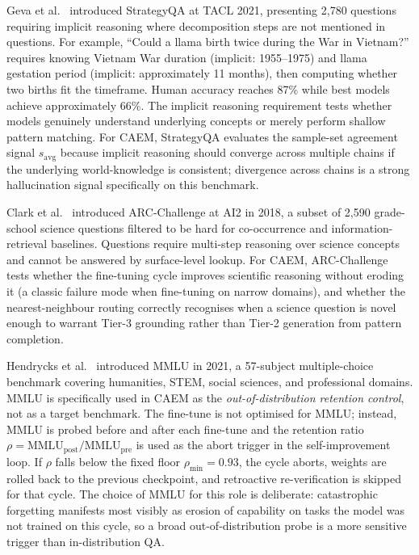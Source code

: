 Geva et al.~\cite{10.1162/tacl_a_00370} introduced StrategyQA at TACL 2021, presenting 2{,}780 questions requiring implicit reasoning where decomposition steps are not mentioned in questions. For example, ``Could a llama birth twice during the War in Vietnam?'' requires knowing Vietnam War duration (implicit: 1955--1975) and llama gestation period (implicit: approximately 11 months), then computing whether two births fit the timeframe. Human accuracy reaches 87\% while best models achieve approximately 66\%. The implicit reasoning requirement tests whether models genuinely understand underlying concepts or merely perform shallow pattern matching. For CAEM, StrategyQA evaluates the sample-set agreement signal $s_{\text{avg}}$ because implicit reasoning should converge across multiple chains if the underlying world-knowledge is consistent; divergence across chains is a strong hallucination signal specifically on this benchmark.

Clark et al.~\cite{clark2018think} introduced ARC-Challenge at AI2 in 2018, a subset of 2{,}590 grade-school science questions filtered to be hard for co-occurrence and information-retrieval baselines. Questions require multi-step reasoning over science concepts and cannot be answered by surface-level lookup. For CAEM, ARC-Challenge tests whether the fine-tuning cycle improves scientific reasoning without eroding it (a classic failure mode when fine-tuning on narrow domains), and whether the nearest-neighbour routing correctly recognises when a science question is novel enough to warrant Tier-3 grounding rather than Tier-2 generation from pattern completion.

Hendrycks et al.~\cite{hendrycks2021measuring} introduced MMLU in 2021, a 57-subject multiple-choice benchmark covering humanities, STEM, social sciences, and professional domains. MMLU is specifically used in CAEM as the \textit{out-of-distribution retention control}, not as a target benchmark. The fine-tune is not optimised for MMLU; instead, MMLU is probed before and after each fine-tune and the retention ratio $\rho = \text{MMLU}_{\text{post}} / \text{MMLU}_{\text{pre}}$ is used as the abort trigger in the self-improvement loop. If $\rho$ falls below the fixed floor $\rho_{\min} = 0.93$, the cycle aborts, weights are rolled back to the previous checkpoint, and retroactive re-verification is skipped for that cycle. The choice of MMLU for this role is deliberate: catastrophic forgetting manifests most visibly as erosion of capability on tasks the model was not trained on this cycle, so a broad out-of-distribution probe is a more sensitive trigger than in-distribution QA.

